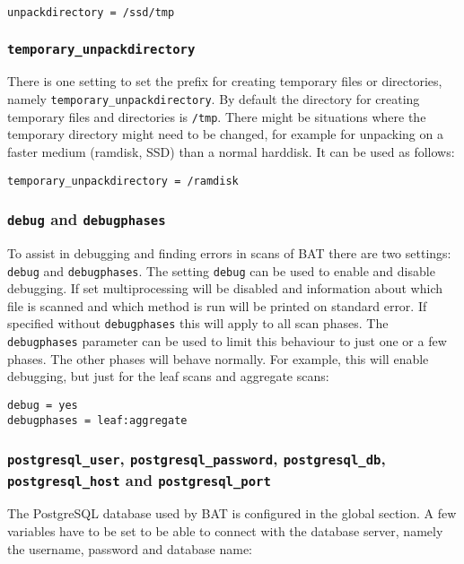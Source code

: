 \documentclass[10pt,a4paper]{article}
\begin{document}
\begin{verbatim}
unpackdirectory = /ssd/tmp
\end{verbatim}

\subsubsection{\texttt{temporary\_unpackdirectory}}

There is one setting to set the prefix for creating temporary files or
directories, namely \texttt{temporary\_unpackdirectory}. By default the
directory for creating temporary files and directories is \texttt{/tmp}. There
might be situations where the temporary directory might need to be changed, for
example for unpacking on a faster medium (ramdisk, SSD) than a normal harddisk.
It can be used as follows:

\begin{verbatim}
temporary_unpackdirectory = /ramdisk
\end{verbatim}

\subsubsection{\texttt{debug} and \texttt{debugphases}}

To assist in debugging and finding errors in scans of BAT there are two
settings: \texttt{debug} and \texttt{debugphases}. The setting \texttt{debug}
can be used to enable and disable debugging. If set multiprocessing will be
disabled and information about which file is scanned and which method is run
will be printed on standard error. If specified without \texttt{debugphases}
this will apply to all scan phases. The \texttt{debugphases} parameter can be
used to limit this behaviour to just one or a few phases. The other phases will
behave normally. For example, this will enable debugging, but just for the
leaf scans and aggregate scans:

\begin{verbatim}
debug = yes
debugphases = leaf:aggregate
\end{verbatim}

\subsubsection{\texttt{postgresql\_user}, \texttt{postgresql\_password}, \texttt{postgresql\_db}, \texttt{postgresql\_host} and \texttt{postgresql\_port}}

The PostgreSQL database used by BAT is configured in the global section. A few
variables have to be set to be able to connect with the database server, namely
the username, password and database name:
\end{document}
